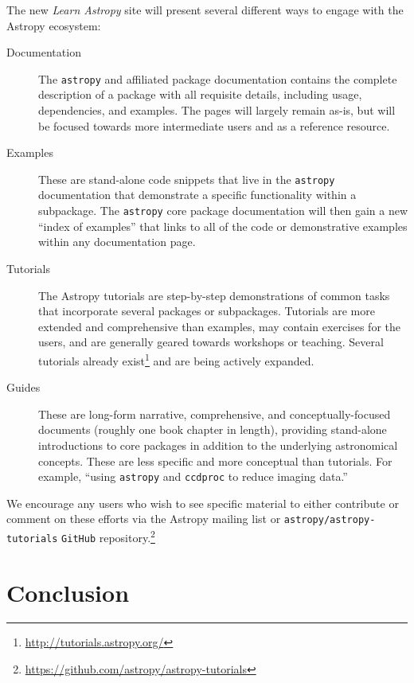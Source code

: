 \documentclass[modern]{aastex61}
\newcommand{\package}[1]{\texttt{#1}\xspace}
\newcommand{\github}{\package{GitHub}}
\newcommand{\astropy}{Astropy\xspace}
\newcommand{\astropypkg}{\package{astropy}}
\begin{document}
The new \emph{Learn Astropy} site will present several different ways to engage
with the \astropy ecosystem:
\begin{description}
    \item[Documentation] The \astropypkg and affiliated package documentation
        contains the complete description of a package with all requisite
        details, including usage, dependencies, and examples.
        The pages will largely remain as-is, but will be focused towards more
        intermediate users and as a reference resource.
    \item[Examples] These are stand-alone code snippets that live in the
        \astropypkg documentation that demonstrate a specific functionality
        within a subpackage.
        The \astropypkg core package documentation will then gain a new ``index
        of examples'' that links to all of the code or demonstrative examples
        within any documentation page.
    \item[Tutorials] The \astropy tutorials are step-by-step demonstrations of
        common tasks that incorporate several packages or subpackages.
        Tutorials are more extended and comprehensive than examples, may contain
        exercises for the users, and are generally geared towards workshops or
        teaching.
        Several tutorials already
        exist\footnote{\url{http://tutorials.astropy.org/}} and are being
        actively expanded.
    \item[Guides] These are long-form narrative, comprehensive, and
        conceptually-focused documents (roughly one book chapter in length),
        providing stand-alone introductions to core packages in addition to the
        underlying astronomical concepts.
        These are less specific and more conceptual than tutorials.
        For example, ``using \astropypkg and \package{ccdproc} to reduce imaging
        data.''
\end{description}
We encourage any users who wish to see specific material to either contribute or
comment on these efforts via the \astropy mailing list or \package{astropy/astropy-tutorials}
\github repository.\footnote{\url{https://github.com/astropy/astropy-tutorials}}

\section{Conclusion}
\label{sec:conclusion}
\end{document}
